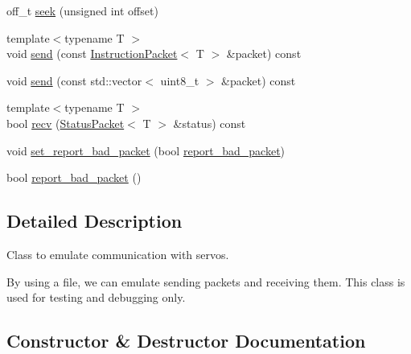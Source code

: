 \begin{DoxyCompactItemize}
\item 
off\+\_\+t \hyperlink{classdynamixel_1_1controllers_1_1_file2_dynamixel_a7d4e1bf3c961bbb85076dea02bb0973c}{seek} (unsigned int offset)
\item 
{\footnotesize template$<$typename T $>$ }\\void \hyperlink{classdynamixel_1_1controllers_1_1_file2_dynamixel_a42df7df1aec98cc3a2d7e67a74ec7143}{send} (const \hyperlink{classdynamixel_1_1_instruction_packet}{Instruction\+Packet}$<$ T $>$ \&packet) const 
\item 
void \hyperlink{classdynamixel_1_1controllers_1_1_file2_dynamixel_a1f442be2a853163124752cba55cb74c6}{send} (const std\+::vector$<$ uint8\+\_\+t $>$ \&packet) const 
\item 
{\footnotesize template$<$typename T $>$ }\\bool \hyperlink{classdynamixel_1_1controllers_1_1_file2_dynamixel_a9406deddb75f65dd427e4e415f49af40}{recv} (\hyperlink{classdynamixel_1_1_status_packet}{Status\+Packet}$<$ T $>$ \&status) const 
\item 
void \hyperlink{classdynamixel_1_1controllers_1_1_file2_dynamixel_afceda9d7938423c7133a1008436b6dee}{set\+\_\+report\+\_\+bad\+\_\+packet} (bool \hyperlink{classdynamixel_1_1controllers_1_1_file2_dynamixel_a961c4a04cfaff34dd9cb71c098b824ca}{report\+\_\+bad\+\_\+packet})
\item 
bool \hyperlink{classdynamixel_1_1controllers_1_1_file2_dynamixel_a961c4a04cfaff34dd9cb71c098b824ca}{report\+\_\+bad\+\_\+packet} ()
\end{DoxyCompactItemize}


\subsection{Detailed Description}
Class to emulate communication with servos.

By using a file, we can emulate sending packets and receiving them. This class is used for testing and debugging only. 

\subsection{Constructor \& Destructor Documentation}
\hypertarget{classdynamixel_1_1controllers_1_1_file2_dynamixel_a9ff507ed75ea792e2fefa4bbb3b71145}{}
